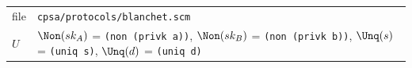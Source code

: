 \par\smallskip\noindent\begin{tabular}{@{}l p{}@{}}
file & \texttt{cpsa/protocols/blanchet.scm}\\
$U$ & $\Non(sk_A)$ = \texttt{(non (privk a))}, $\Non(sk_B)$ = \texttt{(non (privk b))}, $\Unq(s)$ = \texttt{(uniq s)}, $\Unq(d)$ = \texttt{(uniq d)}\\
\end{tabular}

